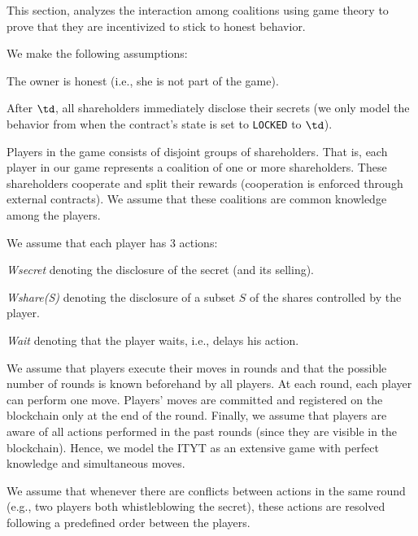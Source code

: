 This section, analyzes the interaction among coalitions using game theory to prove that they are incentivized to stick to honest behavior.

%
We make the following assumptions:
\begin{compactenum} 
\item The owner is honest (i.e., she is not part of the game).

\item After $\td$, all shareholders immediately disclose their secrets (we only model the behavior from when the contract's state is set to \texttt{LOCKED} to $\td$).

\item Players in the game consists of disjoint groups of shareholders.
%
That is, each player in our game represents a coalition of one or more shareholders.
%
These shareholders cooperate and split their rewards (cooperation is enforced through external contracts).
%
We assume that these coalitions are common knowledge among the players.

\item We assume that each player has 3 actions: 
\begin{compactitem}
\item \textit{Wsecret} denoting the disclosure of the secret (and its selling).
\item \textit{Wshare(S)} denoting the disclosure of a subset $S$ of the shares controlled by the player.
\item \textit{Wait} denoting that the player waits, i.e., delays his action.
\end{compactitem}

\item We assume that players execute their moves in rounds and that the possible number of rounds is known beforehand by all players.
%
At each round, each player can perform one move. 
%
Players' moves are committed and registered on the blockchain only at the end of the round.
%
Finally, we assume that players are aware of all actions performed in the past rounds (since they are visible in the blockchain).
%
Hence, we model the ITYT as an extensive game with perfect knowledge and simultaneous moves. 

\item We assume that whenever there are conflicts between actions in the same round (e.g., two players both whistleblowing the secret), these actions are resolved following a predefined order between the players.

\end{compactenum}

